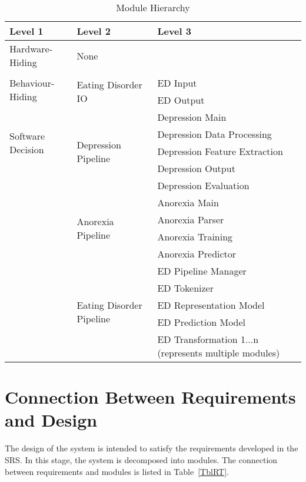 \documentclass[12pt, titlepage]{article}
\begin{document}
\begin{table}[h!]
\centering
\begin{tabular}{p{} p{} p{}}
\toprule
\textbf{Level 1} & \textbf{Level 2} & \textbf{Level 3}\\
\midrule

{Hardware-Hiding} & None \\
\midrule

\multirow{3}{*}{Behaviour-Hiding} & \\ \cline{2-3}
& \multirow{2}{*}{Eating Disorder IO} & ED Input\\
& & ED Output\\
\midrule

\multirow{4}{*}{Software Decision} 
& \multirow{5}{*}{Depression Pipeline} & Depression Main\\ 
& & Depression Data Processing\\
& & Depression Feature Extraction\\
& & Depression Output\\ 
& & Depression Evaluation\\\cline{2-3}
& \multirow{4}{*}{Anorexia Pipeline} & Anorexia Main\\ 
& & Anorexia Parser\\
& & Anorexia Training\\
& & Anorexia Predictor\\ \cline{2-3}
& \multirow{5}{*}{Eating Disorder Pipeline} & ED Pipeline Manager\\
& & ED Tokenizer\\
& & ED Representation Model\\
& & ED Prediction Model\\
& & ED Transformation 1...n (represents multiple modules)\\
\bottomrule

\end{tabular}
\caption{Module Hierarchy}
\label{TblMH}
\end{table}

\newpage

\section{Connection Between Requirements and Design} \label{SecConnection}

The design of the system is intended to satisfy the requirements developed in
the SRS. In this stage, the system is decomposed into modules. The connection
between requirements and modules is listed in Table~\ref{TblRT}.
\end{document}
